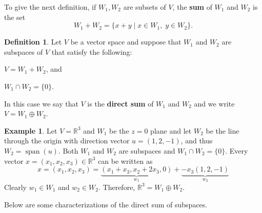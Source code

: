 \documentclass[12pt]{article}
\DeclareMathOperator{\spn}{span}
\newcommand{\real}{\mathbb{R}}
\theoremstyle{definition}
\newtheorem{definition}{Definition}[section]
\newtheorem{example}{Example}[section]
\begin{document}
To give the next definition, if $W_1, W_2$ are subsets of $V$, the \textbf{sum} of $W_1$ and $W_2$ is the set
\[
W_1 + W_2 = \{x+y\;|\; x\in W_1,\; y\in W_2\}.
\]
\begin{definition}
Let $V$ be a vector space and suppose that  $W_1$ and $W_2$ are subspaces of $V$ that satisfy the following:
\begin{compactenum}[(i)]
\item $V=W_1+W_2$, and
\item $W_1\cap W_2=\{0\}$.
\end{compactenum}
In this case we say that $V$ is the \textbf{direct sum} of $W_1$ and $W_2$ and we write $V=W_1 \oplus W_2$.
\end{definition}

\begin{example}
Let $V=\real^3$ and $W_1$ be the $z=0$ plane and let $W_2$ be the line through the origin with direction vector $u=(1,2,-1)$, and thus $W_2=\spn(u)$.  Both $W_1$ and $W_2$ are subspaces and $W_1\cap W_2 = \{0\}$.  Every vector $x=(x_1,x_2,x_3)\in\real^3$ can be written as
\[
x = (x_1,x_2,x_3) = \underbrace{(x_1 + x_3, x_2 + 2x_3, 0)}_{w_1} + \underbrace{-x_3 (1,2,-1)}_{w_2}
\]
Clearly $w_1\in W_1$ and $w_2 \in W_2$.  Therefore, $\real^3 = W_1\oplus W_2$.
\end{example}

Below are some characterizations of the direct sum of subspaces.
\end{document}

